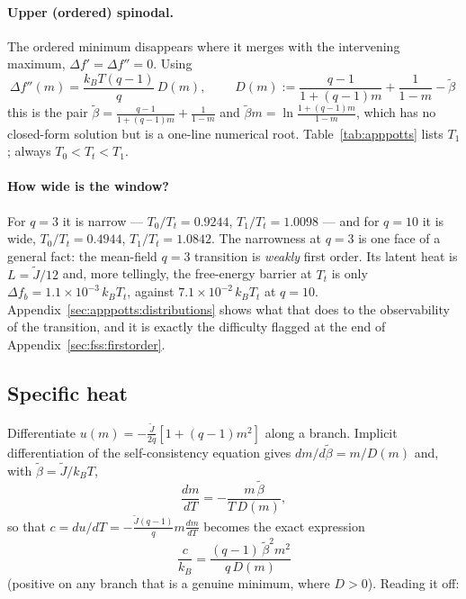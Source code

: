 \documentclass[10pt,a4paper]{article}
\theoremstyle{remark}
\begin{document}
\paragraph{Upper (ordered) spinodal.} The ordered minimum disappears where it
merges with the intervening maximum, $\Delta f'=\Delta f''=0$. Using
\[
\Delta f''(m)=\frac{k_BT(q-1)}{q}\,D(m),
\qquad
\;D(m):=\frac{q-1}{1+(q-1)m}+\frac{1}{1-m}-\tilde\beta\
\]
this is the pair $\tilde\beta=\frac{q-1}{1+(q-1)m}+\frac{1}{1-m}$ and
$\tilde\beta m=\ln\frac{1+(q-1)m}{1-m}$, which has no closed-form solution but is
a one-line numerical root. Table~\ref{tab:apppotts} lists $T_1$; always
$T_0<T_t<T_1$.

\paragraph{How wide is the window?} For $q=3$ it is narrow --- $T_0/T_t=0.9244$,
$T_1/T_t=1.0098$ --- and for $q=10$ it is wide, $T_0/T_t=0.4944$,
$T_1/T_t=1.0842$. The narrowness at $q=3$ is one face of a general fact: the
mean-field $q=3$ transition is \emph{weakly} first order. Its latent heat is
$L=\tilde J/12$ and, more tellingly, the free-energy barrier at $T_t$ is only
$\Delta f_b=1.1\times10^{-3}\,k_BT_t$, against $7.1\times10^{-2}\,k_BT_t$ at
$q=10$. Appendix~\ref{sec:apppotts:distributions} shows what that does to the
observability of the transition, and it is exactly the difficulty flagged at the
end of Appendix~\ref{sec:fss:firstorder}.

\subsection{Specific heat}
\label{sec:apppotts:c}

Differentiate $u(m)=-\frac{\tilde J}{2q}[1+(q-1)m^{2}]$ along a branch. Implicit
differentiation of the self-consistency equation gives
$dm/d\tilde\beta=m/D(m)$ and, with $\tilde\beta=\tilde J/k_BT$,
\[
\frac{dm}{dT}=-\frac{m\,\tilde\beta}{T\,D(m)} ,
\]
so that $c=du/dT=-\frac{\tilde J(q-1)}{q}m\frac{dm}{dT}$ becomes the exact
expression
\[
\;
\frac{c}{k_B}=\frac{(q-1)\,\tilde\beta^{2}m^{2}}{q\,D(m)}\
\]
(positive on any branch that is a genuine minimum, where $D>0$). Reading it off:
\end{document}
